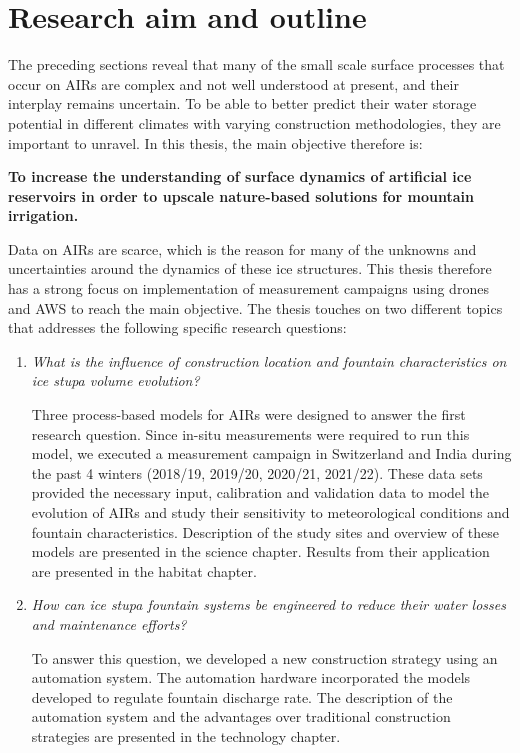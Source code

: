 \section{Research aim and outline}

The preceding sections reveal that many of the small scale surface processes that occur on \ac{AIRs} are complex
and not well understood at present, and their interplay remains uncertain. To be able to better predict their
water storage potential in different climates with varying construction methodologies, they are important to
unravel. In this thesis, the main objective therefore is:

\begin{thesis_quotation}

  \textbf{To increase the understanding of surface dynamics of artificial ice reservoirs in order to upscale
  nature-based solutions for mountain irrigation.}

\end{thesis_quotation}

Data on \ac{AIRs} are scarce, which is the reason for many of the unknowns and uncertainties around the dynamics
of these ice structures. This thesis therefore has a strong focus on implementation of measurement campaigns
using drones and \ac{AWS} to reach the main objective. The thesis touches on two different topics that
addresses the following specific research questions:

\begin{enumerate}

  \item \textit{What is the influence of construction location and fountain characteristics on ice stupa volume
    evolution?}

Three process-based models for \ac{AIRs} were designed to answer the first research question. Since in-situ
    measurements were required to run this model, we executed a measurement campaign in Switzerland and India
    during the past 4 winters (2018/19, 2019/20, 2020/21, 2021/22). These data sets provided the necessary
    input, calibration and validation data to model the evolution of \ac{AIRs} and study their sensitivity to
    meteorological conditions and fountain characteristics. Description of the study sites and overview of these
    models are presented in the science chapter. Results from their application are presented in the habitat
    chapter.

  \item \textit{How can ice stupa fountain systems be engineered to reduce their water losses and maintenance
    efforts?}

To answer this question, we developed a new construction strategy using an automation system. The automation
    hardware incorporated the models developed to regulate fountain discharge rate. The description of the
    automation system and the advantages over traditional construction strategies are presented in the
    technology chapter.

\end{enumerate}

